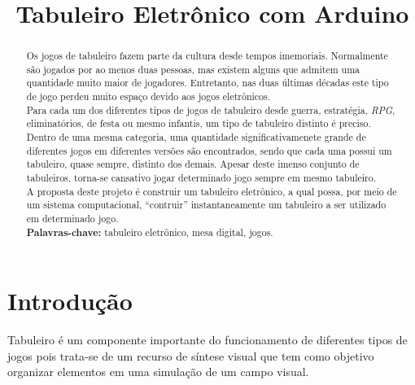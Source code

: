 \documentclass[a4paper,10pt]{article}
\title{Tabuleiro Eletrônico com Arduino}
\author{}
\date{}
\begin{document}
\maketitle

\begin{abstract}
Os jogos de tabuleiro fazem parte da cultura desde tempos imemoriais. Normalmente são jogados por ao menos duas pessoas, mas existem alguns que admitem uma quantidade muito maior de jogadores. Entretanto, nas duas últimas décadas este tipo de jogo perdeu muito espaço devido aos jogos eletrônicos. \\ 

Para cada um dos diferentes tipos de jogos de tabuleiro desde guerra, estratégia, {\it RPG}, eliminatórios, de festa ou mesmo infantis, um tipo de tabuleiro distinto é preciso. Dentro de uma mesma categoria, uma quantidade significativamenete grande de diferentes jogos em diferentes versões são encontrados, sendo que cada uma possui um tabuleiro, quase sempre, distinto dos demais. Apesar deste imenso conjunto de tabuleiros, torna-se cansativo jogar determinado jogo sempre em mesmo tabuleiro. \\

A proposta deste projeto é construir um tabuleiro eletrônico, a qual possa, por meio de um sistema computacional, ``contruir'' instantaneamente um tabuleiro a ser utilizado em determinado jogo. \\

\noindent \textbf{Palavras-chave:} tabuleiro eletrônico, mesa digital, jogos.
\end{abstract}



\section{Introdução}
Tabuleiro é um componente importante do funcionamento de diferentes tipos de jogos pois trata-se de um recurso de síntese visual que tem como objetivo organizar elementos em uma simulação de um campo visual. \\
\end{document}
